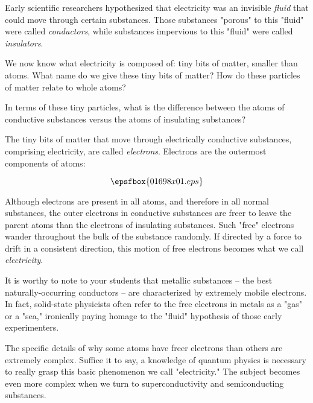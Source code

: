 

Early scientific researchers hypothesized that electricity was an invisible {\it fluid} that could move through certain substances.  Those substances "porous" to this "fluid" were called {\it conductors}, while substances impervious to this "fluid" were called {\it insulators}.

\vskip 10pt

We now know what electricity is composed of: tiny bits of matter, smaller than atoms.  What name do we give these tiny bits of matter?  How do these particles of matter relate to whole atoms?

\vskip 10pt

In terms of these tiny particles, what is the difference between the atoms of conductive substances versus the atoms of insulating substances?







The tiny bits of matter that move through electrically conductive substances, comprising electricity, are called {\it electrons}.  Electrons are the outermost components of atoms:

$$\epsfbox{01698x01.eps}$$

Although electrons are present in all atoms, and therefore in all normal substances, the outer electrons in conductive substances are freer to leave the parent atoms than the electrons of insulating substances.  Such "free" electrons wander throughout the bulk of the substance randomly.  If directed by a force to drift in a consistent direction, this motion of free electrons becomes what we call {\it electricity}.







It is worthy to note to your students that metallic substances -- the best naturally-occurring conductors -- are characterized by extremely mobile electrons.  In fact, solid-state physicists often refer to the free electrons in metals as a "gas" or a "sea," ironically paying homage to the "fluid" hypothesis of those early experimenters.

The specific details of why some atoms have freer electrons than others are extremely complex.  Suffice it to say, a knowledge of quantum physics is necessary to really grasp this basic phenomenon we call "electricity."  The subject becomes even more complex when we turn to superconductivity and semiconducting substances.




